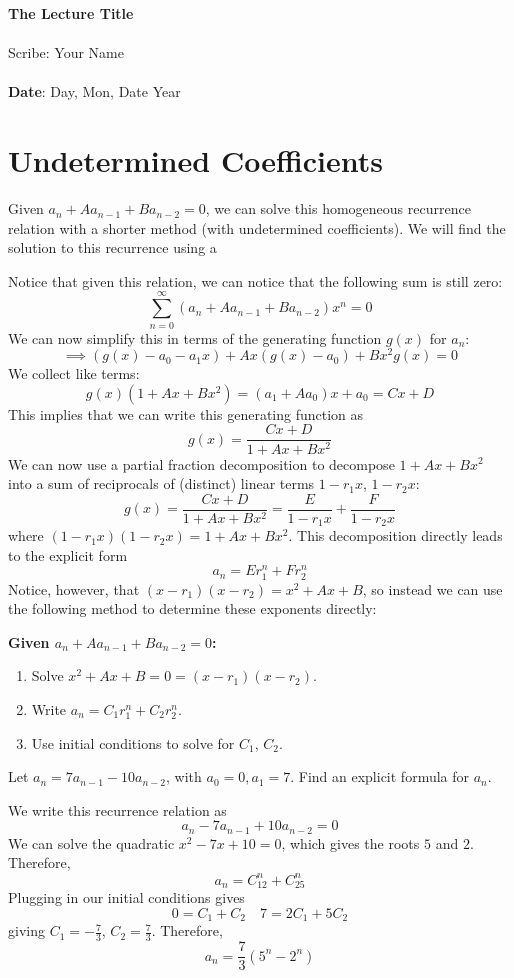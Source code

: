 \documentclass[11pt,twosided]{article}
\def\titlestring{The Lecture Title}
\def\scribestring{Your Name}
\def\datestring{Day, Mon, Date Year}
\begin{document}
\thispagestyle{plain}  %

\noindent
{\LARGE \textbf{\titlestring}}\\\\
%
{\Large Scribe: \scribestring}\\ \\
{\textbf{Date}: \datestring}


\noindent

\section{Undetermined Coefficients}
Given $a_n + A a_{n-1} + Ba_{n-2} = 0$, we can solve this homogeneous recurrence relation with a shorter method (with undetermined coefficients). We will find the solution to this recurrence using a 

Notice that given this relation, we can notice that the following sum is still zero: 
\[
	\sum_{n=0}^\infty (a_n + Aa_{n-1} + Ba_{n-2})x^n = 0
\]
We can now simplify this in terms of the generating function $g(x)$ for $a_n$: 
\[
 \implies (g(x) - a_0 - a_1 x) + Ax(g(x) - a_0) + Bx^2 g(x) = 0
\]
We collect like terms: 
\[
	g(x) ( 1 + Ax + Bx^2) = (a_1 + Aa_0)x + a_0 = Cx + D
\]
This implies that we can write this generating function as 
\[
	g(x) = \frac{Cx+D}{1 + Ax + Bx^2}
\]
We can now use a partial fraction decomposition to decompose $1 + Ax + Bx^2$ into a sum of reciprocals of (distinct) linear terms $1-r_1x$, $1-r_2x$:
\[
	g(x) = \frac{Cx+D}{1 + Ax + Bx^2} = \frac{E}{1-r_1x} + \frac{F}{1-r_2x}
\]
where $(1-r_1x)(1-r_2x) = 1 + Ax + Bx^2$. This decomposition directly leads to the explicit form
\[
	a_n = Er_1^n + F r_2^n
\]
Notice, however, that $(x-r_1)(x-r_2) = x^2 + Ax + B$, so instead we can use the following method to determine these exponents directly: 

\textbf{Given $a_n + A a_{n-1} + Ba_{n-2} = 0$:}
\begin{enumerate}
\item Solve $x^2 + Ax + B = 0 = (x-r_1)(x-r_2)$. 
\item Write $a_n = C_1r_1^n + C_2r_2^n$. 
\item Use initial conditions to solve for $C_1$, $C_2$. 
\end{enumerate}

\begin{problem}{1}
Let $a_n = 7a_{n-1} -10a_{n-2}$, with $a_0 = 0, a_1 = 7$. Find an explicit formula for $a_n$. 
\end{problem}
\begin{solution}
	We write this recurrence relation as 
	\[
		a_n - 7a_{n-1} + 10a_{n-2} = 0
	\]
	We can solve the quadratic $x^2 - 7x + 10 = 0$, which gives the roots $5$ and $2$. Therefore, 
	\[
		a_n = C_12^n + C_25^n
	\]
	Plugging in our initial conditions gives
	\[
		0 = C_1 + C_2 \quad 7 = 2C_1 + 5C_2
	\]	
	giving $C_1 = -\frac{7}{3}$, $C_2 = \frac{7}{3}$. Therefore, 
	\[
		a_n = \frac{7}{3} (5^n - 2^n)
	\]
\end{solution}
\end{document}
